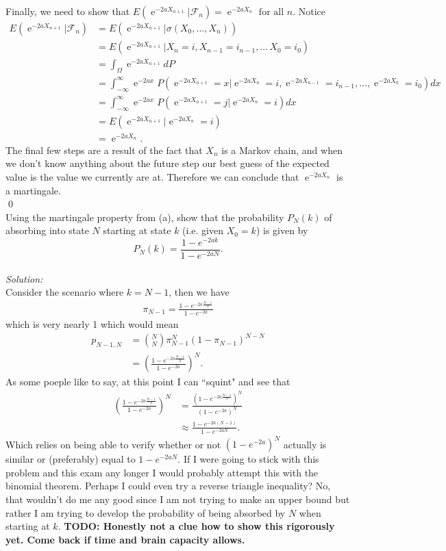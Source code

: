 \documentclass[10pt]{amsart}
\DeclareMathOperator{\E}{e}
\begin{document}
\noindent
Finally, we need to show that $E ( \E^{-2 a X_{n + 1}} | \mathcal F_n ) = \E^{-2 a X_n} \text{ for all } n$.
Notice
\begin{align*}
E ( \E^{-2 a X_{n + 1}}  | \mathcal F_n ) &= E ( \E^{-2 a X_{n + 1}}  | \sigma(X_0, ..., X_n) ) \\
	&= E ( \E^{-2 a X_{n + 1}}  | X_n = i, X_{n-1} = i_{n-1}, ... \, X_0 = i_0 ) \\
	&= \int_\Omega \E^{-2 a X_{n + 1}}  d P\\
	&= \int_{-\infty}^\infty \E^{-2 a x} P( \E^{-2 a X_{n + 1}} = x | \E^{-2 a X_n} = i, \E^{-2 a X_{n-1}} = i_{n-1}, ..., \E^{-2 a X_0} = i_0 ) dx \\
	&= \int_{-\infty}^\infty \E^{-2 a x} P( \E^{-2 a X_{n + 1}} = j | \E^{-2 a X_n} = i) dx \\
	&= E( \E^{-2 a X_{n + 1}} | \E^{-2 a X_n} = i) \\
	&= \E^{-2 a X_n}.
\end{align*}
The final few steps are a result of the fact that $X_n$ is a Markov chain, and when we don't know anything about the future step our best guess of the expected value is the value we currently are at.
Therefore we can conclude that $\E^{-2 a X_n}$ is a martingale. \\
\qed \\


  Using the martingale property from (a), show that the probability $P_N(k)$ of absorbing into state $N$ starting at state $k$ (i.e. given $X_0=k$) is given by
$$P_N(k)=\frac{1-e^{-2ak}}{1-e^{-2aN}}.$$ \\

\noindent
\textit{Solution:} \\
Consider the scenario where $k = N - 1$, then we have
\begin{align*}
\pi_{N - 1}=\frac{1-e^{-2a\frac{N - 1}{N}}}{1-e^{-2a}}
\end{align*}
which is very nearly 1 which would mean
\begin{align*}
p_{N-1,N} &= {N \choose N} \pi_{N - 1}^N (1-\pi_{N - 1})^{N-N} \\
	&= \left(\frac{1-e^{-2a\frac{N - 1}{N}}}{1-e^{-2a}}\right)^N.
\end{align*}
As some poeple like to say, at this point I can ``squint" and see that 
\begin{align*}
\left(\frac{1-e^{-2a\frac{N - 1}{N}}}{1-e^{-2a}}\right)^N
	&= \frac{\left(1-e^{-2a\frac{N - 1}{N}}\right)^N}{\left(1-e^{-2a}\right)^N} \\
	&\approx \frac{1-e^{-2a(N - 1)}}{1-e^{-2aN}}.
\end{align*}
Which relies on being able to verify whether or not
$\left(1-e^{-2a}\right)^N$ actually is similar or (preferably) equal to $1-e^{-2aN}$.
If I were going to stick with this problem and this exam any longer I would probably attempt this with the binomial theorem.
Perhaps I could even try a reverse triangle inequality? No, that wouldn't do me any good since I am not trying to make an upper bound but rather I am trying to develop the probability of being absorbed by $N$ when starting at $k$.
\textbf{TODO: Honestly not a clue how to show this rigorously yet. Come back if time and brain capacity allows.}
\end{document}
